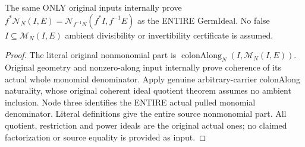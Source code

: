 \begin{theorem}
\label{hir:submersion-relative-parts-whole-nonmonomial}
\leanok
The same ONLY original inputs internally prove
$f^*\mathcal N_N(I,E)=\mathcal N_{f^{-1}N}(f^*I,f^{-1}E)$ as the ENTIRE
GermIdeal. No false $I\subseteq\mathcal M_N(I,E)$ ambient divisibility or
invertibility certificate is assumed.
\end{theorem}
\begin{proof}
The literal original nonmonomial part is
$\operatorname{colonAlong}_N(I,\mathcal M_N(I,E))$. Original geometry and
nonzero-along input internally prove coherence of its actual whole
monomial denominator. Apply genuine arbitrary-carrier colonAlong
naturality, whose original coherent ideal quotient theorem assumes no
ambient inclusion. Node three identifies the ENTIRE actual pulled monomial
denominator. Literal definitions give the entire source nonmonomial part.
All quotient, restriction and power ideals are the original actual ones;
no claimed factorization or source equality is provided as input.
\end{proof}

